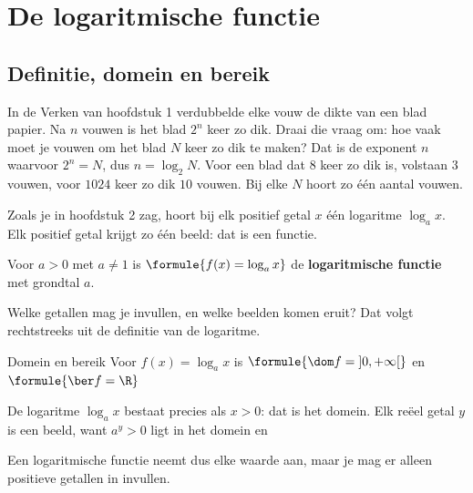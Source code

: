 \begin{oefeningen}[Start]

\end{oefeningen}

\section{De logaritmische functie}

\subsection{Definitie, domein en bereik}

In de Verken van hoofdstuk 1 verdubbelde elke vouw de dikte van een blad papier. Na $n$ vouwen is het blad $2^n$ keer zo dik. Draai die vraag om: hoe vaak moet je vouwen om het blad $N$ keer zo dik te maken? Dat is de exponent $n$ waarvoor $2^n = N$, dus $n = \log_2 N$. Voor een blad dat $8$ keer zo dik is, volstaan $3$ vouwen, voor $1024$ keer zo dik $10$ vouwen. Bij elke $N$ hoort zo één aantal vouwen.

Zoals je in hoofdstuk 2 zag, hoort bij elk positief getal $x$ één logaritme $\log_a x$. Elk positief getal krijgt zo één beeld: dat is een functie.

\begin{theorie}
Voor $a > 0$ met $a \neq 1$ is $\formule{f(x) = \log_a x}$ de \textbf{\textcolor{accent}{logaritmische functie}} met grondtal $a$.
\end{theorie}

Welke getallen mag je invullen, en welke beelden komen eruit? Dat volgt rechtstreeks uit de definitie van de logaritme.

\begin{theorie}
\begin{stelling}{Domein en bereik}
Voor $f(x) = \log_a x$ is \qquad $\formule{\dom f = \left]0, +\infty\right[}$ \qquad en \qquad $\formule{\ber f = \R}$
\end{stelling}
\begin{bewijs}
De logaritme $\log_a x$ bestaat precies als $x > 0$: dat is het domein. Elk reëel getal $y$ is een beeld, want $a^y > 0$ ligt in het domein en
\end{bewijs}
\end{theorie}

Een logaritmische functie neemt dus elke waarde aan, maar je mag er alleen positieve getallen in invullen.

